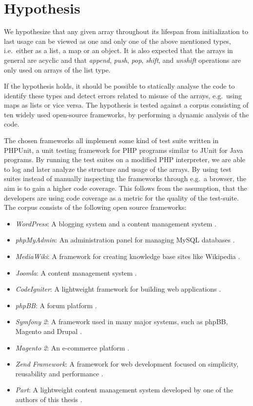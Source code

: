 \section{Hypothesis}
\label{sec:dynhypothesis}
We hypothesize that any given array throughout its lifespan from initialization to last usage can be viewed as one and only one of the above mentioned types, i.e.\ either as a list, a map or an object. It is also expected that the arrays in general are acyclic and that \emph{append}, \textit{push}, \textit{pop}, \textit{shift}, and \textit{unshift} operations are only used on arrays of the list type.

If the hypothesis holds, it should be possible to statically analyse the code to identify these types and detect errors related to misuse of the arrays, e.g.\ using maps as lists or vice versa. The hypothesis is tested against a corpus consisting of ten widely used open-source frameworks, by performing a dynamic analysis of the code.

The chosen frameworks all implement some kind of test suite written in PHPUnit, a unit testing framework for PHP programs similar to JUnit for Java programs. By running the test suites on a modified PHP interpreter, we are able to log and later analyze the structure and usage of the arrays. By using test suites instead of manually inspecting the frameworks through e.g.\ a browser, the aim is to gain a higher code coverage. This follows from the assumption, that the developers are using code coverage as a metric for the quality of the test-suite. The corpus consists of the following open source frameworks:

\begin{itemize}
    \item \emph{WordPress}: A blogging system and a content management system .
    \item \emph{phpMyAdmin}: An administration panel for managing MySQL databases .
    \item \emph{MediaWiki}: A framework for creating knowledge base sites like Wikipedia .
    \item \emph{Joomla}: A content management system .
    \item \emph{CodeIgniter}: A lightweight framework for building web applications .
    \item \emph{phpBB}: A forum platform .
    \item \emph{Symfony 2}: A framework used in many major systems, such as phpBB, Magento and Drupal .
    \item \emph{Magento 2}: An e-commerce platform .
    \item \emph{Zend Framework}: A framework for web development focused on simplicity, reusability and performance .
    \item \emph{Part}: A lightweight content management system developed by one of the authors of this thesis .
\end{itemize}
